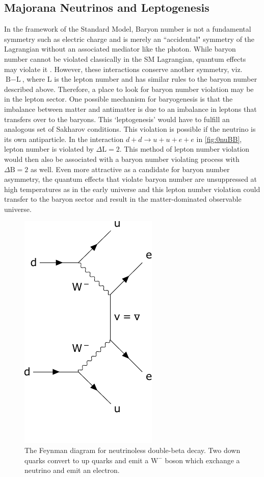 \subsection{Majorana Neutrinos and Leptogenesis}
In the framework of the Standard Model, Baryon number is not a fundamental symmetry such as electric charge and is merely an ``accidental" symmetry of the Lagrangian without an associated mediator like the photon. While baryon number cannot be violated classically in the SM Lagrangian, quantum effects may violate it \cite{PhysRevLett.37.8}. However, these interactions conserve another symmetry, viz. $\textrm{B}-\textrm{L}$, where L is the lepton number and has similar rules to the baryon number described above. Therefore, a place to look for baryon number violation may be in the lepton sector. One possible mechanism for baryogenesis is that the imbalance between matter and antimatter is due to an imbalance in leptons that transfers over to the baryons. This `leptogenesis' would have to fulfill an analogous set of Sakharov conditions. This violation is possible if the neutrino is its own antiparticle. In the interaction $d + d \rightarrow u + u + e + e$ in \autoref{fig:0nuBB}, lepton number is violated by $\Delta\textrm{L}=2$. This method of lepton number violation would then also be associated with a baryon number violating process with $\Delta\textrm{B}=2$ as well. Even more attractive as a candidate for baryon number asymmetry, the quantum effects that violate baryon number are unsuppressed at high temperatures as in the early universe and this lepton number violation could transfer to the baryon sector and result in the matter-dominated observable universe.

\begin{figure}[tbph]
\centering
\includegraphics[width=0.35\linewidth]{Figures/0NuBB_clip.pdf}
\caption[Feynman diagram for neutrinoless double-beta decay]{The Feynman diagram for neutrinoless double-beta decay. Two down quarks convert to up quarks and emit a $\textrm{W}^{-}$ boson which exchange a neutrino and emit an electron.}
\label{fig:0nuBB}
\end{figure}
